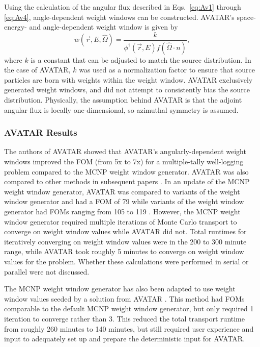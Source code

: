 Using the calculation of the angular flux described in Eqs.\ \eqref{eq:Av1}
through \eqref{eq:Av4}, angle-dependent weight windows can be constructed.
AVATAR's space- energy- and angle-dependent weight window is given by
\begin{equation}
\bar {w} (\vec{r},E,\hat\Omega) = \frac{k}{\phi^{\dagger}(\vec{r},E)
                                  f(\hat\Omega \cdot n)},
\end{equation}
where $k$ is a constant that can be adjusted to match the source distribution.
In the case of AVATAR, $k$ was used as a normalization factor to ensure that
source particles are born with weights within the weight window.
AVATAR exclusively generated weight windows, and did not attempt to consistently
bias the source
distribution. Physically, the assumption behind AVATAR is that the adjoint
angular flux
is locally one-dimensional, so azimuthal symmetry is assumed.

\subsubsection*{AVATAR Results}

The authors of AVATAR showed that AVATAR's angularly-dependent
weight windows improved the FOM (from 5x to 7x) for a multiple-tally well-logging
problem compared to the MCNP weight window generator. AVATAR was also compared
to other methods in subsequent papers \cite{evans_enhanced_1998}. In an
update of the MCNP weight window generator, AVATAR was compared to variants of
the weight window generator and had a FOM of 79 while variants of the
weight window generator had FOMs ranging from 105 to 119
\cite{evans_enhanced_1998}. However, the MCNP weight window generator required
multiple iterations of Monte Carlo transport to converge on weight window values
while AVATAR did not. Total runtimes for iteratively converging on weight window
values were in the 200 to 300 minute range, while AVATAR took roughly 5
minutes to converge on weight window values for the problem. Whether these
calculations were performed in serial or parallel were not discussed.

The MCNP weight window generator has also been adapted to use weight window
values seeded by a solution from AVATAR \cite{evans_enhanced_1998}. This method
had FOMs comparable to the default MCNP weight window generator, but only
required 1 iteration to converge rather than 3. This reduced the total
transport runtime from roughly 260 minutes to 140 minutes, but still required
user experience and input to adequately set up and prepare the deterministic
input for AVATAR.

